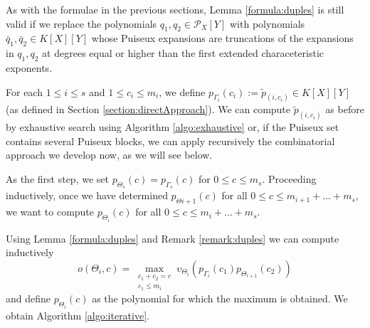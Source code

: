 \documentclass[a4paper,11pt]{amsart}%
\theoremstyle{definition}
\theoremstyle{plain}
\theoremstyle{remark}
\newcommand{\Px}{{\mathcal{P}_X}}
\begin{document}
As with the formulae in the previous sections, Lemma \ref{formula:duples} is still valid if we replace the polynomials $q_1, q_2 \in \Px[Y]$ with polynomials $\bar q_1, \bar q_2 \in K[X][Y]$ whose Puiseux expansions are truncations of the expansions in $q_1, q_2$ at degrees equal or higher than the first extended characeteristic exponents.

For each $1 \le i \le s$ and $1 \le c_i \le m_i$, we define $p_{\Gamma_{i}}(c_i) := \tilde p_{(i, c_i)} \in K[X][Y]$ (as defined in Section \ref{section:directApproach}).
We can compute $\tilde p_{(i, c_i)}$ as before by exhaustive search using Algorithm \ref{algo:exhaustive} or, if the Puiseux set contains several Puiseux blocks, we can apply recursively the combinatorial approach  we develop now, as we will see below.

As the first step, we set $p_{\Theta_{s}}(c) = p_{\Gamma_{s}}(c)$ for $0 \leq c \leq m_{s}$.
Proceeding inductively, once we have determined $p_{\Theta{i+1}}(c)$ for
all $0 \leq c \leq m_{i+1} + \dots+ m_{s}$, we want to compute
$p_{\Theta_{i}}(c)$ for all $0 \leq c \leq m_{i} + \dots+ m_{s}$.

Using Lemma \ref{formula:duples} and Remark \ref{remark:duples} we can compute inductively
\[
o(\Theta_{i}, c) = \max_{\substack{c_{1} + c_{2} = c \\ c_{1} \le m_i}} \upsilon_{{\Theta_{i}}%
}(p_{\Gamma_{i}}(c_{1})p_{\Theta_{i+1}}(c_{2}))
\]
and define $p_{\Theta_{i}}(c)$ as the polynomial for which the maximum is obtained.
We obtain Algorithm \ref{algo:iterative}.





\end{document}
